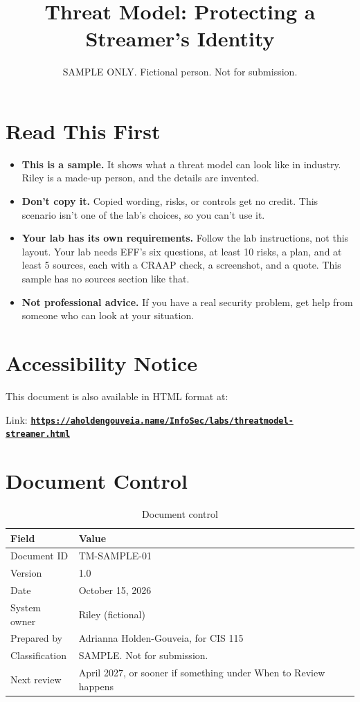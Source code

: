 \documentclass[11pt]{article}
\title{Threat Model: Protecting a Streamer's Identity}
\author{SAMPLE ONLY. Fictional person. Not for submission.}
\date{\vspace{-5ex}}
\begin{document}
\maketitle

\section*{Read This First}
\begin{itemize}
    \item \textbf{This is a sample.} It shows what a threat model can look like in industry. Riley is a made-up person, and the details are invented.
    \item \textbf{Don't copy it.} Copied wording, risks, or controls get no credit. This scenario isn't one of the lab's choices, so you can't use it.
    \item \textbf{Your lab has its own requirements.} Follow the lab instructions, not this layout. Your lab needs EFF's six questions, at least 10 risks, a plan, and at least 5 sources, each with a CRAAP check, a screenshot, and a quote. This sample has no sources section like that.
    \item \textbf{Not professional advice.} If you have a real security problem, get help from someone who can look at your situation.
\end{itemize}

\section*{Accessibility Notice}
This document is also available in HTML format at:

Link: \href{https://aholdengouveia.name/InfoSec/labs/threatmodel-streamer.html}{\textbf{\nolinkurl{https://aholdengouveia.name/InfoSec/labs/threatmodel-streamer.html}}}

\section{Document Control}
\begin{table}[H]
\caption{Document control}
\begin{tabular}{|m{}|m{}|}
\hline
\textbf{Field} & \textbf{Value} \\
\hline
Document ID & TM-SAMPLE-01 \\
\hline
Version & 1.0 \\
\hline
Date & October 15, 2026 \\
\hline
System owner & Riley (fictional) \\
\hline
Prepared by & Adrianna Holden-Gouveia, for CIS 115 \\
\hline
Classification & SAMPLE. Not for submission. \\
\hline
Next review & April 2027, or sooner if something under When to Review happens
\end{tabular}
\end{table}
\end{document}
